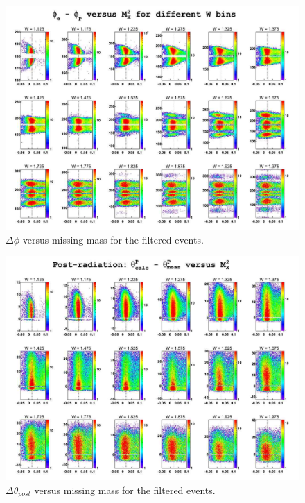 \begin{landscape}
	\begin{figure}[ht]
	\centering
		\includegraphics[width=1.15\textheight]{img/dphi_epXmm2_all_cuts.jpg}
		\caption{$\Delta\phi$ versus missing mass for the filtered events.}
	\label{fig:dphi_epXmm2_all_cuts}
	\end{figure}
\end{landscape}


\begin{landscape}
	\begin{figure}[ht]
	\centering
		\includegraphics[width=1.15\textheight]{img/dth1_epXmm2_all_cuts.jpg}
		\caption{$\Delta\theta_{post}$ versus missing mass for the filtered events.}
	\label{fig:dth1_epXmm2_all_cuts}
	\end{figure}
\end{landscape}


